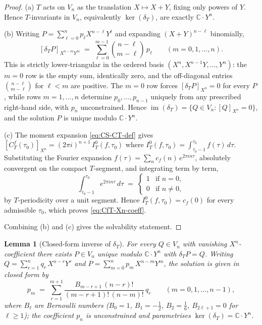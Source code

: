 \documentclass[11pt]{article}
\newtheorem{lemma}[theorem]{Lemma}
\numberwithin{equation}{section}  %
\newcommand{\CC}{\mathbb{C}}
\begin{document}
\begin{proof}
(a) $T$ acts on $V_n$ as the translation $X \mapsto X + Y$, fixing only
powers of $Y$.  Hence $T$-invariants in $V_n$, equivalently
$\ker(\delta_T)$, are exactly $\CC \cdot Y^n$.

(b) Writing $P = \sum_{\ell = 0}^{n} p_\ell X^{n - \ell} Y^\ell$ and expanding
$(X + Y)^{n - \ell}$ binomially,
\begin{equation}\label{eq:delta-T-matrix}
  [\delta_T P]_{X^{n - m} Y^m}
  \;=\; \sum_{\ell = 0}^{m - 1}\!\binom{n - \ell}{m - \ell}\,p_\ell
  \qquad (m = 0, 1, \ldots, n).
\end{equation}
This is strictly lower-triangular in the ordered basis
$(X^n, X^{n - 1}Y, \ldots, Y^n)$: the $m = 0$ row is the empty sum,
identically zero, and the off-diagonal entries
$\binom{n - \ell}{m - \ell}$ for $\ell < m$ are positive.  The $m = 0$ row
forces $[\delta_T P]_{X^n} = 0$ for every $P$, while rows
$m = 1, \ldots, n$ determine $p_0, \ldots, p_{n - 1}$ uniquely from any
prescribed right-hand side, with $p_n$ unconstrained.  Hence
$\operatorname{im}(\delta_T) = \{Q \in V_n : [Q]_{X^n} = 0\}$, and the
solution $P$ is unique modulo $\CC \cdot Y^n$.

(c) The moment expansion \eqref{eq:CS-CT-def} gives
$[C^f_T(\tau_0)]_{X^n} = (2\pi i)^{n+1}\,I^0_T(f, \tau_0)$ where
$I^0_T(f, \tau_0) = \int_{\tau_0 - 1}^{\tau_0}\!f(\tau)\,d\tau$.
Substituting the Fourier expansion $f(\tau) = \sum_n c_f(n)\,
e^{2\pi i n \tau}$, absolutely convergent on the compact $T$-segment,
and integrating term by term,
\begin{equation}
  \int_{\tau_0 - 1}^{\tau_0}\!e^{2\pi i n \tau}\,d\tau
  \;=\; \begin{cases} 1 & \text{if } n = 0,\\
                       0 & \text{if } n \ne 0,
        \end{cases}
\end{equation}
by $T$-periodicity over a unit segment.  Hence $I^0_T(f, \tau_0) = c_f(0)$
for every admissible $\tau_0$, which proves \eqref{eq:CfT-Xn-coeff}.

Combining (b) and (c) gives the solvability statement.
\end{proof}

\begin{lemma}[Closed-form inverse of $\delta_T$]\label{lem:Bernoulli-inv}
For every $Q \in V_n$ with vanishing $X^n$-coefficient there exists
$P \in V_n$ unique modulo $\CC \cdot Y^n$ with $\delta_T P = Q$.
Writing $Q = \sum_{r = 1}^{n} q_r\,X^{n - r} Y^r$ and
$P = \sum_{m = 0}^{n} p_m\,X^{n - m} Y^m$, the solution is given in
closed form by
\begin{equation}\label{eq:Bernoulli-inv}
  p_m \;=\; \sum_{r = 1}^{m + 1}\!\frac{B_{m - r + 1}\,(n - r)!}{(m - r + 1)!\,(n - m)!}\,q_r
  \qquad (m = 0, 1, \ldots, n - 1),
\end{equation}
where $B_\ell$ are Bernoulli numbers ($B_0 = 1$, $B_1 = -\tfrac{1}{2}$,
$B_2 = \tfrac{1}{6}$, $B_{2\ell + 1} = 0$ for $\ell \ge 1$); the
coefficient $p_n$ is unconstrained and parametrises
$\ker(\delta_T) = \CC \cdot Y^n$.
\end{lemma}
\end{document}
